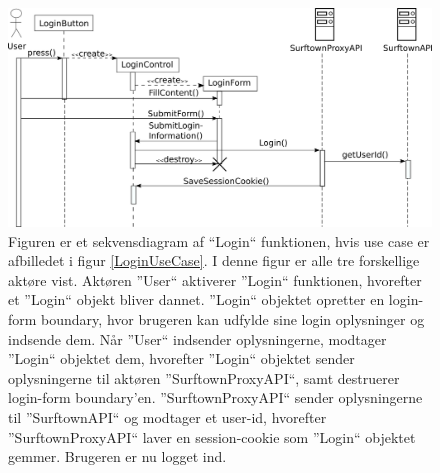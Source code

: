 \documentclass[12pt]{article}
\begin{document}
\begin{figure}
	\centering
	\includegraphics[width=13cm]{sekvens_diagrammer/login.png}
	\caption{Figuren er et sekvensdiagram af ``Login`` funktionen, hvis use case er afbilledet i figur \ref{LoginUseCase}. I denne figur er alle tre forskellige aktøre vist. Aktøren ''User`` aktiverer ''Login`` funktionen, hvorefter et ''Login`` objekt bliver dannet. ''Login`` objektet opretter en login-form boundary, hvor brugeren kan udfylde sine login oplysninger og indsende dem. Når ''User`` indsender oplysningerne, modtager ''Login`` objektet dem, hvorefter ''Login`` objektet sender oplysningerne til aktøren ''SurftownProxyAPI``, samt destruerer login-form boundary'en. ''SurftownProxyAPI`` sender oplysningerne til ''SurftownAPI`` og modtager et user-id, hvorefter ''SurftownProxyAPI`` laver en session-cookie som ''Login`` objektet gemmer. Brugeren er nu logget ind.}
	\label{fig:Login}
\end{figure}
\end{document}
